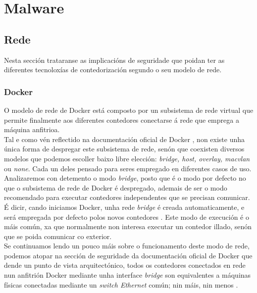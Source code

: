 \chapter{Malware}

\section{Rede}

Nesta sección trataranse as implicacións de seguridade que poidan ter as diferentes tecnoloxías de contedorización segundo o seu modelo de rede.

\subsection{Docker}

O modelo de rede de Docker está composto por un subsistema de rede virtual que permite finalmente aos diferentes contedores conectarse á rede que emprega a máquina anfitrioa.\\

Tal e como vén reflectido na documentación oficial de Docker \cite{docker-networking}, non existe unha única forma de despregar este subsistema de rede, senón que coexisten diversos modelos que podemos escoller baixo libre elección: \textit{bridge, host, overlay, macvlan} ou \textit{none}. Cada un deles pensado para seres empregado en diferentes casos de uso.\\

Analizaremos con detemento o modo \textit{bridge}, posto que é o modo por defecto no que o subsistema de rede de Docker é despregado, ademais de ser o modo recomendado para executar contedores independentes que se precisan comunicar. É dicir, cando iniciamos Docker, unha rede \textit{bridge} é creada automaticamente, e será empregada por defecto polos novos contedores \cite{docker-bridge-networks}. Este modo de execución é o máis común, xa que normalmente non interesa executar un contedor illado, senón que se poida comunicar co exterior.\\

Se continuamos lendo un pouco máis sobre o funcionamento deste modo de rede, podemos atopar na sección de seguridade da documentación oficial de Docker que dende un punto de vista arquitectónico, todos os contedores conectados en rede nun anfitrión Docker mediante unha interface \textit{bridge} son equivalentes a máquinas físicas conectadas mediante un \textit{switch Ethernet} común; nin máis, nin menos \cite{docker-security}.\\

